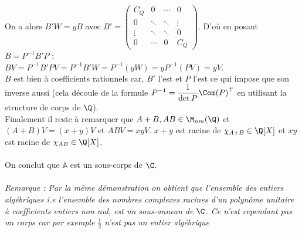 \documentclass[8pt]{book}
\begin{document}
\begin{itemize}
		On a alors $B'W=yB$ avec $B'=\left(\begin{array}{c|c|c|c}
			C_Q&0&\cdots&0\\
			\hline
			0&\ddots&\ddots&\vdots\\
			\hline
			\vdots&\ddots&\ddots&0\\
			\hline
			0&\cdots&0&C_Q
		\end{array}\right)$. D'où en posant $B=P^{-1}B'P$ :\\
		$BV=P^{-1}B'PV=P^{-1}B'W=P^{-1}(yW)=yP^{-1}(PV)=yV$.\\
		$B$ est bien à coefficients rationnels car, $B'$ l'est et $P$ l'est ce qui impose que son inverse aussi (cela découle de la formule $P^{-1}=\displaystyle\frac{1}{\det P}\Com(P)^\top$ en utilisant la structure de corps de $\Q$).\\
		Finalement il reste à remarquer que $A+B,AB\in \M_{nm}(\Q)$ et $(A+B)V=(x+y)V$ et $ABV=xyV$. $x+y$ est racine de $\chi_{A+B}\in \Q[X]$ et $xy$ est racine de $\chi_{AB}\in \Q[X]$.\\\\
		On conclut que $\mathbb A$ est un sous-corps de $\C$.\\\\
		\textit{Remarque : Par la même démonstration on obtient que l'ensemble des entiers algébriques i.e l'ensemble des nombres complexes racines d'un polynôme unitaire à coefficients entiers non nul, est un sous-anneau de $\C$. Ce n'est cependant pas un corps car par exemple $\frac{1}{2}$ n'est pas un entier algébrique}
	\end{itemize}
	
\end{document}
